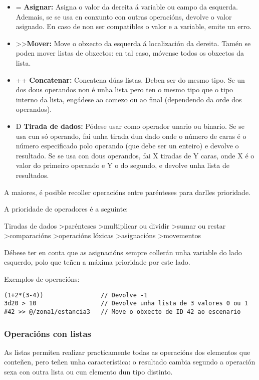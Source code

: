 \begin{itemize}
  Se polo menos un dos dous é verdadeiro, devolve 1, en caso contrario, devolve
  0.
  \item = {\bf Asignar:} Asigna o valor da dereita á variable ou campo da
  esquerda. Ademais, se se usa en conxunto con outras operacións, devolve o
  valor asignado. En caso de non ser compatibles o valor e a variable, emite un
  erro.
  \item \textgreater\textgreater {\bf Mover:} Move o obxecto da esquerda á
  localización da dereita. Tamén se poden mover listas de obxectos: en tal caso,
  móvense todos os obxectos da lista.
  \item ++ {\bf Concatenar:} Concatena dúas listas. Deben ser do mesmo tipo. Se
  un dos dous operandos non é unha lista pero ten o mesmo tipo que o tipo
  interno da lista, engádese ao comezo ou ao final (dependendo da orde dos
  operandos).
  \item D {\bf Tirada de dados:} Pódese usar como operador unario ou binario. Se
  se usa cun só operando, fai unha tirada dun dado onde o número de caras é o
  número especificado polo operando (que debe ser un enteiro) e devolve o
  resultado. Se se usa con dous operandos, fai X tiradas de Y caras, onde X é o
  valor do primeiro operando e Y o do segundo, e devolve unha lista de
  resultados.
\end{itemize}
\par A maiores, é posible recoller operacións entre parénteses para darlles
prioridade.
\par A prioridade de operadores é a seguinte:
\par
Tiradas de dados \textgreater parénteses \textgreater multiplicar ou dividir
\textgreater sumar ou restar \textgreater comparacións \textgreater operacións
lóxicas \textgreater asignacións \textgreater movementos
\par
Débese ter en conta que as asignacións sempre collerán unha variable do
lado esquerdo, polo que teñen a máxima prioridade por este lado.
\par Exemplos de operacións:
\begin{lstlisting}
(1+2*(3-4))                // Devolve -1
3d20 > 10                  // Devolve unha lista de 3 valores 0 ou 1
#42 >> @/zona1/estancia3   // Move o obxecto de ID 42 ao escenario
\end{lstlisting}
\subsubsection{Operacións con listas}
As listas permiten realizar practicamente todas as operacións dos elementos que
conteñen, pero teñen unha característica: o resultado cambia segundo a operación
sexa con outra lista ou cun elemento dun tipo distinto.
